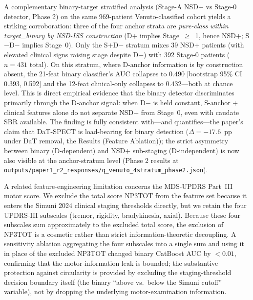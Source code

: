 \documentclass[10pt,letterpaper]{article}
\begin{document}
A complementary binary-target stratified analysis (Stage-A NSD$+$ vs Stage-0 detector, Phase 2) on the same 969-patient Venuto-classified cohort yields a striking corroboration: three of the four anchor strata are \emph{pure-class within target\_binary by NSD-ISS construction} (D$+$ implies Stage~$\geq$~1, hence NSD$+$; S$-$D$-$ implies Stage~0). Only the S$+$D$-$ stratum mixes 39 NSD$+$ patients (with elevated clinical signs raising stage despite D$-$) with 392 Stage-0 patients ($n{=}431$ total). On this stratum, where D-anchor information is by construction absent, the 21-feat binary classifier's AUC collapses to $0.490$ [bootstrap 95\% CI 0.393, 0.592] and the 12-feat clinical-only collapses to $0.432$---both at chance level. This is direct empirical evidence that the binary detector discriminates primarily through the D-anchor signal: when D$-$ is held constant, S-anchor + clinical features alone do not separate NSD$+$ from Stage~0, even with caudate SBR available. The finding is fully consistent with---and quantifies---the paper's claim that DaT-SPECT is load-bearing for binary detection ($\Delta{=}{-}17.6$~pp under DaT removal, the Results (Feature Ablation)); the strict asymmetry between binary (D-dependent) and NSD$+$ sub-staging (D-independent) is now also visible at the anchor-stratum level (Phase 2 results at \texttt{outputs/paper1\_r2\_responses/q\_venuto\_4stratum\_phase2.json}).

A related feature-engineering limitation concerns the MDS-UPDRS Part~III motor score. We exclude the total score NP3TOT from the feature set because it enters the Simuni 2024 clinical staging thresholds directly, but we retain the four UPDRS-III subscales (tremor, rigidity, bradykinesia, axial). Because these four subscales sum approximately to the excluded total score, the exclusion of NP3TOT is a cosmetic rather than strict information-theoretic decoupling. A sensitivity ablation aggregating the four subscales into a single sum and using it in place of the excluded NP3TOT changed binary CatBoost AUC by ${<}0.01$, confirming that the motor-information leak is bounded; the substantive protection against circularity is provided by excluding the staging-threshold decision boundary itself (the binary ``above vs.\ below the Simuni cutoff'' variable), not by dropping the underlying motor-examination information.
\end{document}
